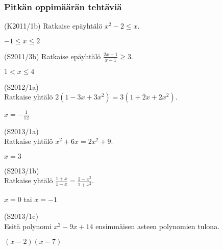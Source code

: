 \subsubsection*{Pitkän oppimäärän tehtäviä}

\begin{tehtava}
(K2011/1b) Ratkaise epäyhtälö $x^2-2 \leq x$.
\begin{vastaus}
$-1 \leq x \leq 2$
\end{vastaus}
\end{tehtava}

\begin{tehtava}
  (S2011/3b) Ratkaise epäyhtälö $\frac{2x+1}{x-1} \geq 3$.
\begin{vastaus}
$1<x \leq 4$
\end{vastaus}
\end{tehtava}

\begin{tehtava}
(S2012/1a) \\ Ratkaise yhtälö $2(1-3x+3x^2) = 3(1+2x+2x^2)$.
\begin{vastaus}
$x=-\frac{1}{12}$
\end{vastaus}
\end{tehtava}

\begin{tehtava}
(S2013/1a) \\ Ratkaise yhtälö $x^2+6x=2x^2+9$.
\begin{vastaus}
$x=3$
\end{vastaus}
\end{tehtava}

\begin{tehtava}
(S2013/1b) \\ Ratkaise yhtälö $\frac{1+x}{1-x}=\frac{1-x^2}{1+x^2}$.
\begin{vastaus}
$x=0$ tai $x=-1$
\end{vastaus}
\end{tehtava}

\begin{tehtava}
(S2013/1c) \\ Esitä polynomi $x^2-9x+14$ ensimmäisen asteen polynomien tulona.
\begin{vastaus}
$(x-2)(x-7)$
\end{vastaus}
\end{tehtava}
  

  

